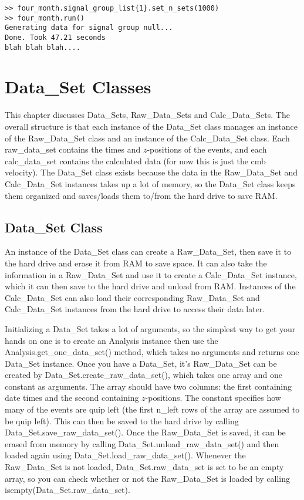 \documentclass[12pt]{report}
\begin{document}
\begin{verbatim}
>> four_month.signal_group_list{1}.set_n_sets(1000)
>> four_month.run()
Generating data for signal group null...
Done. Took 47.21 seconds
blah blah blah....
\end{verbatim}





\chapter{Data\_Set Classes}
\label{chap:DataSet}
This chapter discusses Data\_Sets, Raw\_Data\_Sets and Calc\_Data\_Sets.  The overall structure is that each instance of the Data\_Set class manages an instance of the Raw\_Data\_Set class and an instance of the Calc\_Data\_Set class.  Each raw\_data\_set contains the times and $z$-positions of the events, and each calc\_data\_set contains the calculated data (for now this is just the cmb velocity).  The Data\_Set class exists because the data in the Raw\_Data\_Set and Calc\_Data\_Set instances takes up a lot of memory, so the Data\_Set class keeps them organized and saves/loads them to/from the hard drive to save RAM.

\section{Data\_Set Class}
An instance of the Data\_Set class can create a Raw\_Data\_Set, then save it to the hard drive and erase it from RAM to save space.  It can also take the information in a Raw\_Data\_Set and use it to create a Calc\_Data\_Set instance, which it can then save to the hard drive and unload from RAM.  Instances of the Calc\_Data\_Set can also load their corresponding Raw\_Data\_Set and Calc\_Data\_Set instances from the hard drive to access their data later.

Initializing a Data\_Set takes a lot of arguments, so the simplest way to get your hands on one is to create an Analysis instance then use the Analysis.get\_one\_data\_set() method, which takes no arguments and returns one Data\_Set instance.  Once you have a Data\_Set, it's Raw\_Data\_Set can be created by Data\_Set.create\_raw\_data\_set(), which takes one array  and one constant as arguments.  The array should have two columns: the first containing date times and the second containing $z$-positions.  The constant specifies how many of the events are quip left (the first n\_left rows of the array are assumed to be quip left).  This can then be saved to the hard drive by calling Data\_Set.save\_raw\_data\_set().  Once the Raw\_Data\_Set is saved, it can be erased from memory by calling Data\_Set.unload\_raw\_data\_set() and then loaded again using Data\_Set.load\_raw\_data\_set().  Whenever the Raw\_Data\_Set is not loaded, Data\_Set.raw\_data\_set is set to be an empty array, so you can check whether or not the Raw\_Data\_Set is loaded by calling isempty(Data\_Set.raw\_data\_set).
\end{document}
